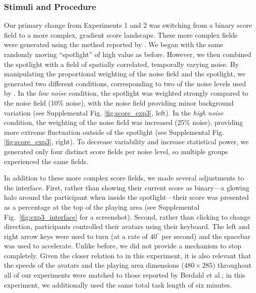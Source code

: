 \documentclass[12pt,letterpaper]{article}
\begin{document}
\subsubsection{Stimuli and Procedure}


Our primary change from Experiments 1 and 2 was switching from a binary score field to a more complex, gradient score landscape.
These more complex fields were generated using the method reported by . 
We began with the same randomly moving ``spotlight'' of high value as before. 
However, we then combined the spotlight with a field of spatially correlated, temporally varying noise.  
By manipulating the proportional weighting of the noise field and the spotlight, we generated two different conditions, corresponding to two of the noise levels used by \citeauthor{berdahl_emergent_2013}. 
In the \emph{low noise} condition, the spotlight was weighted strongly compared to the noise field (10\% noise), with the noise field providing minor background variation (see Supplemental Fig. \ref{fig:score_exp3}, left). 
In the \emph{high noise} condition, the weighting of the noise field was increased (25\% noise), providing more extreme fluctuation outside of the spotlight (see Supplemental Fig. \ref{fig:score_exp3}, right).
To decrease variability and increase statistical power, we generated only four distinct score fields per noise level, so multiple groups experienced the same fields.  

In addition to these more complex score fields, we made several adjustments to the interface.
First, rather than showing their current score as binary---a glowing halo around the participant when inside the spotlight---their score was presented as a percentage at the top of the playing area (see Supplemental Fig.~\ref{fig:exp3_interface} for a screenshot).
Second, rather than clicking to change direction, participants controlled their avatars using their keyboard. 
The left and right arrow keys were used to turn (at a rate of $40^\circ$ per second) and the
spacebar was used to accelerate. 
Unlike before, we did not provide a mechanism to stop completely.  
Given the closer relation to  in this experiment, it is also relevant that the speeds of the avatars and the playing area dimensions ($480 \times 285$) throughout all of our experiments were matched to those reported by Berdahl et al.; in this experiment, we additionally used the same total task length of six minutes.
\end{document}
